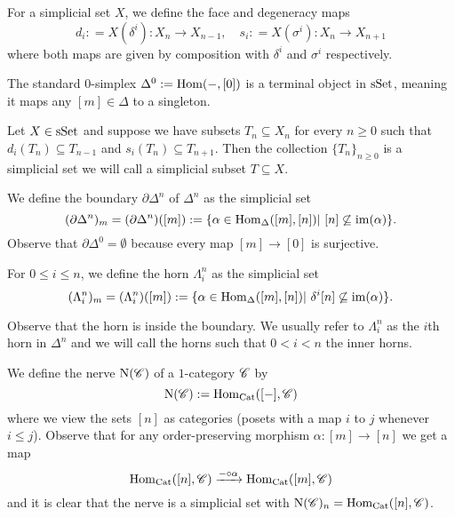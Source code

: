 \documentclass[../thesis.tex]{subfiles}
\begin{document}
\begin{definition}
    For a simplicial set $X$, we define the face and degeneracy maps
    \[
        d_i: = X(\delta^i): X_{n} \to X_{n-1}, \quad s_i: = X(\sigma^i): X_{n} \to X_{n+1}
    \]
    where both maps are given by composition with $\delta^i$ and $\sigma^i$ respectively.
\end{definition}
\begin{example}
    The standard $0$-simplex $\Delta^0:=\mathrm{Hom}({-}, [0])$ is a terminal object in $\mathrm{sSet}$, meaning it maps any $[m]\in \Delta$ to a singleton.
\end{example}
\begin{example}
    Let $X \in \mathrm{sSet}$ and suppose we have subsets $T_n\subseteq X_n$ for every $n\geq 0$ such that $d_i(T_n)\subseteq T_{n-1}$ and $s_i(T_n) \subseteq T_{n+1}$.
    Then the collection $\{T_n\}_{n\geq 0}$ is a simplicial set we will call a simplicial subset $T\subseteq X$.
\end{example}
\begin{definition}
    We define the boundary $\partial\Delta^n$ of $\Delta^n$ as the simplicial set
    \[
        (\partial\Delta^n)_m = (\partial\Delta^n)([m]) :=\{\alpha \in \Hom_{\Delta}([m], [n]) | [n] \not\subseteq \mathrm{im}(\alpha)\}.
    \]
    Observe that $\partial\Delta^0=\emptyset$ because every map $[m] \to [0]$ is surjective.
\end{definition}
\begin{definition}
    For $0\leq i \leq n$, we define the horn $\Lambda_i^n$ as the simplicial set
    \[
        (\Lambda_i^n)_m =(\Lambda_i^n)([m]) :=\{\alpha \in \Hom_{\Delta}([m], [n]) | \delta^i[n] \not\subseteq \mathrm{im}(\alpha)\}.
    \]
\end{definition}
Observe that the horn is inside the boundary.
We usually refer to $\Lambda_i^n$ as the $i$th horn in $\Delta^n$ and we will call the horns such that $0<i<n$ the inner horns.
\begin{example}
\end{example}
\begin{example}
    We define the nerve $\mathrm{N}(\mathscr{C})$ of a $1$-category $\mathscr{C}$ by
    \[
        \mathrm{N}(\mathscr{C}) : = \mathrm{Hom}_{\mathrm{Cat}}([{-}], \mathscr{C})
    \]
    where we view the sets $[n]$ as categories (posets with a map $i$ to $j$ whenever $i\leq j$).
    Observe that for any order-preserving morphism $\alpha : [m] \to [n]$ we get a map
    \[
        \mathrm{Hom}_{\mathrm{Cat}}([n], \mathscr{C}) \xrightarrow{{-} \circ \alpha} \mathrm{Hom}_{\mathrm{Cat}}([m], \mathscr{C})
    \]
    and it is clear that the nerve is a simplicial set with $\mathrm{N}(\mathscr{C})_n = \mathrm{Hom}_{\mathrm{Cat}}([n], \mathscr{C})$.
\end{example}
\end{document}
